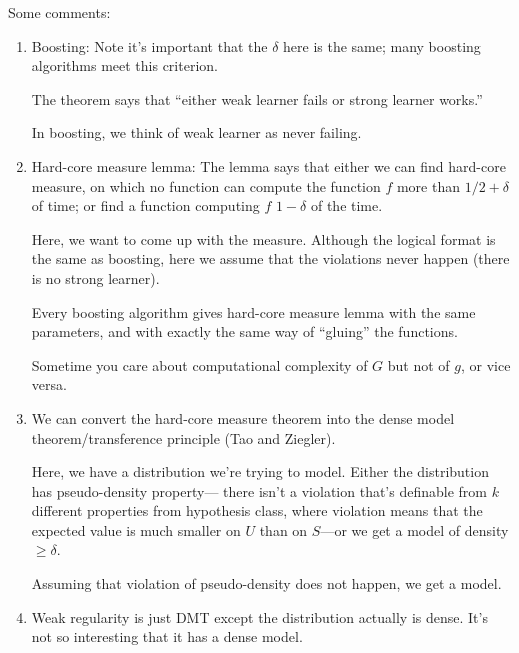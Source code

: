Some comments:

\begin{enumerate}
\item
Boosting: %
Note it's important that the $\delta$ here is the same; many boosting algorithms meet this criterion.

The theorem says that ``either weak learner fails or strong learner works.'' 

In boosting, we think of weak learner as never failing.

\item Hard-core measure lemma:  The lemma says that either we can find hard-core
measure, on which no function can compute the function $f$ more than $1/2 +\delta$
of time; or find a function computing $f$ $1-\delta$ of the time.

Here, we want to come up with the measure. Although the logical format is the same as boosting, here we assume that the violations never happen (there is no strong learner).

Every boosting algorithm gives hard-core measure lemma with the same parameters, and with exactly the same way of ``gluing'' the functions. 

Sometime you care about computational complexity of $G$ but not of $g$, or vice versa. 
\item
We can convert the hard-core measure theorem into the dense model theorem/transference principle (Tao and Ziegler).

Here, we have a distribution we're trying to model. 
Either the distribution has pseudo-density property--- there isn't a violation that's definable from $k$ different properties from hypothesis class, where violation means that the expected value is much smaller on $U$ than on $S$---or we get a model of density $\ge \delta$. %

Assuming that violation of pseudo-density does not happen, we get a model.
\item
Weak regularity is just DMT except the distribution actually is dense. It's not so interesting that it has a dense model. 


\end{enumerate}
